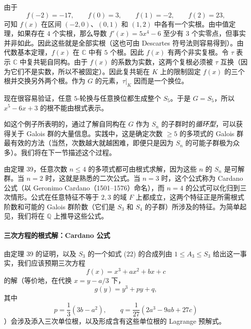 由于
\[
f(-2)=-17,
\qquad f(0)=3,
\qquad f(1)=-2,
\qquad f(2)=23,
\]
可知 $f(x)$ 在区间 $(-2,0)$、$(0,1)$ 和 $(1,2)$ 中各有一个实根。由中值定理，如果存在 $4$ 个实根，那么导数 $f'(x)=5x^4-6$ 至少有 $3$ 个实零点，但事实并非如此。因此这些就是全部实根（这也可由 Descartes 符号法则容易得到）。由代数基本定理，$f(x)$ 在 $\mathbb C$ 中有 $5$ 个根。因此 $f(x)$ 有两个非实复根。令 $\tau$ 表示 $\mathbb C$ 中复共轭自同构。由于 $f(x)$ 的系数为实数，这两个复根必须被 $\tau$ 互换（因为它们不是实数，所以不被固定）。因此复共轭在 $K$ 上的限制固定 $f(x)$ 的三个根并交换另外两个根。作为 $G$ 的元素，$\tau|_K$ 因而是一个换位。

现在很容易验证，任意 $5$-轮换与任意换位都生成整个 $S_5$。于是 $G=S_5$，所以 $x^5-6x+3$ 的根不能由根式表示。

如这个例子所表明的，通过了解自同构在 $G$ 作为 $S_n$ 的子群时的\emph{循环型}，可以获得关于 Galois 群的大量信息。实践中，这是确定次数 $\geq 5$ 的多项式的 Galois 群最有效的方法（当然，次数越大就越困难，即便只是因为 $S_n$ 的可能子群极为众多）。我们将在下一节描述这个过程。

由定理 39，任意次数 $n\leq 4$ 的多项式都可由根式求解，因为这些 $n$ 的 $S_n$ 是可解群。当 $n=2$ 时，这就是熟悉的二次公式。当 $n=3$ 时，这个公式称为 Cardano 公式（以 Geronimo Cardano（1501--1576）命名），而 $n=4$ 的公式可以化归到三次情形。公式在任意特征不等于 $2,3$ 的域 $F$ 上都成立，这两个特征正是所需根式阶数和可能的 Galois 群阶数（它们是 $S_3$ 和 $S_4$ 的子群）所涉及的特征。为简单起见，我们将在 $\mathbb Q$ 上推导这些公式。

\paragraph{三次方程的根式解：Cardano 公式}
由定理 39 的证明，以及 $S_3$ 的一个如式 (22) 的合成列由 $1\leq A_3\leq S_3$ 给出这一事实，我们应该预期三次方程
\[
f(x)=x^3+ax^2+bx+c
\]
的解（等价地，在代换 $x=y-a/3$ 下，
\[
g(y)=y^3+py+q,
\]
其中
\[
p=\frac13(3b-a^2),
\qquad
q=\frac1{27}(2a^3-9ab+27c)
\]
）会涉及添入三次单位根，以及形成含有这些单位根的 Lagrange 预解式。

